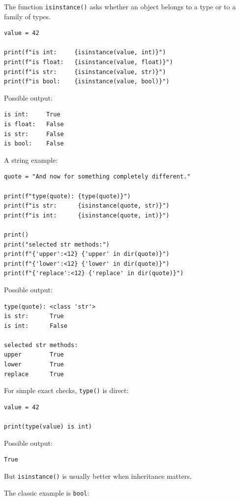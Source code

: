 The function \texttt{isinstance()} asks whether an object belongs to a type or to a family of types.

\begin{verbatim}
value = 42

print(f"is int:     {isinstance(value, int)}")
print(f"is float:   {isinstance(value, float)}")
print(f"is str:     {isinstance(value, str)}")
print(f"is bool:    {isinstance(value, bool)}")
\end{verbatim}

Possible output:

\begin{verbatim}
is int:     True
is float:   False
is str:     False
is bool:    False
\end{verbatim}

A string example:

\begin{verbatim}
quote = "And now for something completely different."

print(f"type(quote): {type(quote)}")
print(f"is str:      {isinstance(quote, str)}")
print(f"is int:      {isinstance(quote, int)}")

print()
print("selected str methods:")
print(f"{'upper':<12} {'upper' in dir(quote)}")
print(f"{'lower':<12} {'lower' in dir(quote)}")
print(f"{'replace':<12} {'replace' in dir(quote)}")
\end{verbatim}

Possible output:

\begin{verbatim}
type(quote): <class 'str'>
is str:      True
is int:      False

selected str methods:
upper        True
lower        True
replace      True
\end{verbatim}

For simple exact checks, \texttt{type()} is direct:

\begin{verbatim}
value = 42

print(type(value) is int)
\end{verbatim}

Possible output:

\begin{verbatim}
True
\end{verbatim}

But \texttt{isinstance()} is usually better when inheritance matters.

The classic example is \texttt{bool}:

